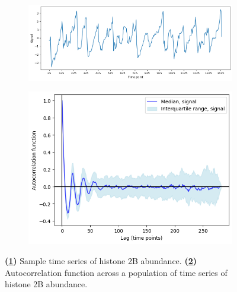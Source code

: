 \begin{figure}
  \centering
  \begin{subfigure}[t]{0.6\textwidth}
  \centering
    \includegraphics[width=\linewidth]{acf_fhn_biol_ts.png}
    \caption{
    }
    \label{fig:acf-fhn-biol-ts}
  \end{subfigure}%
  \begin{subfigure}[t]{0.4\textwidth}
  \centering
    \includegraphics[width=\linewidth]{acf_fhn_biol_acf.png}
    \caption{
    }
    \label{fig:acf-fhn-biol-acf}
  \end{subfigure}


  \caption[
    Sample time series of histone 2B abundance, its autocorrelation function, and fitting exponential decay functions.
  ]{
    \textbf{(\ref{fig:acf-fhn-biol-ts})}
    Sample time series of histone 2B abundance.
    \textbf{(\ref{fig:acf-fhn-biol-acf})}
    Autocorrelation function across a population of time series of histone 2B abundance.
  }
  \label{fig:acf-fhn-biol}
\end{figure}

